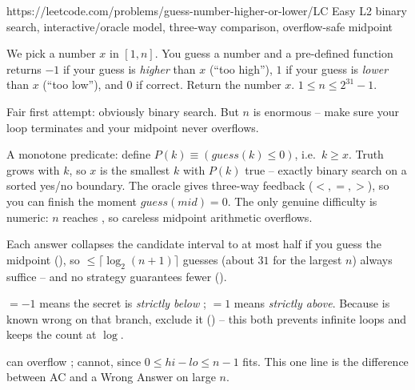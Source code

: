  {https://leetcode.com/problems/guess-number-higher-or-lower/}{LC Easy L2}
  {binary search, interactive/oracle model, three-way comparison, overflow-safe midpoint}

\begin{problemstatement}
We pick a number $x$ in $[1, n]$. You guess a number and a pre-defined function 
returns \textbf{$-1$} if your guess is \emph{higher} than $x$ (``too high''), \textbf{$1$} if your guess
is \emph{lower} than $x$ (``too low''), and \textbf{$0$} if correct. Return the number $x$.
$1\le n\le 2^{31}-1$.
\end{problemstatement}

\begin{attemptgate}
Fair first attempt: obviously binary search. But $n$ is enormous -- make sure your loop terminates
and your midpoint never overflows.
\end{attemptgate}

A monotone predicate: define $P(k)\equiv(\mathit{guess}(k)\le 0)$, i.e.\ $k\ge x$. Truth grows with
$k$, so $x$ is the smallest $k$ with $P(k)$ true -- exactly binary search on a sorted yes/no boundary.
The oracle gives three-way feedback ($<,=,>$), so you can finish the moment $\mathit{guess}(\mathit{mid})=0$.
The only genuine difficulty is numeric: $n$ reaches , so careless midpoint arithmetic
overflows.

\begin{observation}
Each answer collapses the candidate interval to at most half if you guess the midpoint
(), so $\le\lceil\log_2(n{+}1)\rceil$ guesses (about $31$ for the largest $n$) always
suffice -- and no strategy guarantees fewer ().
\end{observation}
\begin{observation}
$=-1$ means the secret is \emph{strictly below} ; $=1$ means \emph{strictly
above}. Because  is known wrong on that branch, exclude it () -- this both
prevents infinite loops and keeps the count at $\log$.
\end{observation}
\begin{observation}
 can overflow ;  cannot, since $0\le\mathit{hi}-\mathit{lo}
\le n-1$ fits. This one line is the difference between AC and a Wrong Answer on large $n$.
\end{observation}

